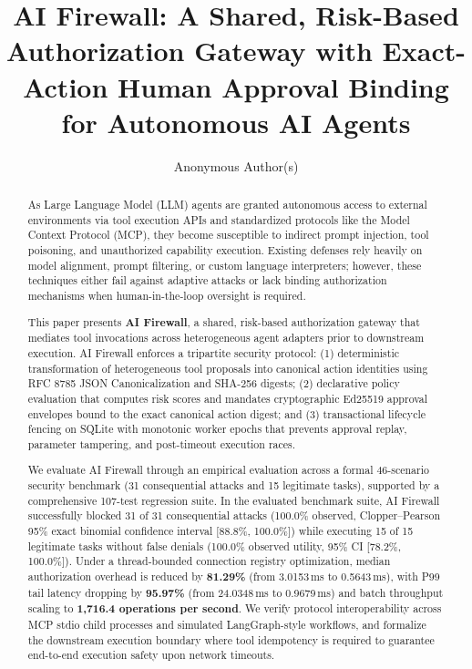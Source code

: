 \documentclass[sigconf,anonymous,review]{acmart}
\begin{document}
\title{AI Firewall: A Shared, Risk-Based Authorization Gateway with Exact-Action Human Approval Binding for Autonomous AI Agents}

\author{Anonymous Author(s)}
\email{}

\begin{abstract}
As Large Language Model (LLM) agents are granted autonomous access to external environments via tool execution APIs and standardized protocols like the Model Context Protocol (MCP), they become susceptible to indirect prompt injection, tool poisoning, and unauthorized capability execution. Existing defenses rely heavily on model alignment, prompt filtering, or custom language interpreters; however, these techniques either fail against adaptive attacks or lack binding authorization mechanisms when human-in-the-loop oversight is required. 

This paper presents \textbf{AI Firewall}, a shared, risk-based authorization gateway that mediates tool invocations across heterogeneous agent adapters prior to downstream execution. AI Firewall enforces a tripartite security protocol: (1) deterministic transformation of heterogeneous tool proposals into canonical action identities using RFC 8785 JSON Canonicalization and SHA-256 digests; (2) declarative policy evaluation that computes risk scores and mandates cryptographic Ed25519 approval envelopes bound to the exact canonical action digest; and (3) transactional lifecycle fencing on SQLite with monotonic worker epochs that prevents approval replay, parameter tampering, and post-timeout execution races.

We evaluate AI Firewall through an empirical evaluation across a formal 46-scenario security benchmark (31 consequential attacks and 15 legitimate tasks), supported by a comprehensive 107-test regression suite. In the evaluated benchmark suite, AI Firewall successfully blocked 31 of 31 consequential attacks (100.0\% observed, Clopper--Pearson 95\% exact binomial confidence interval [88.8\%, 100.0\%]) while executing 15 of 15 legitimate tasks without false denials (100.0\% observed utility, 95\% CI [78.2\%, 100.0\%]). Under a thread-bounded connection registry optimization, median authorization overhead is reduced by \textbf{81.29\%} (from 3.0153\,ms to 0.5643\,ms), with P99 tail latency dropping by \textbf{95.97\%} (from 24.0348\,ms to 0.9679\,ms) and batch throughput scaling to \textbf{1,716.4 operations per second}. We verify protocol interoperability across MCP stdio child processes and simulated LangGraph-style workflows, and formalize the downstream execution boundary where tool idempotency is required to guarantee end-to-end execution safety upon network timeouts.
\end{abstract}
\end{document}
